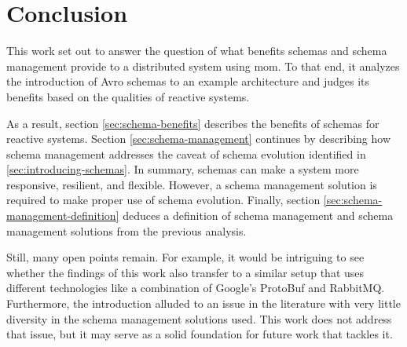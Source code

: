 
\section{Conclusion}\label{sec:conclusion}

This work set out to answer the question of what benefits schemas and schema management provide to a distributed system using \gls{mom}.
To that end, it analyzes the introduction of Avro schemas to an example architecture and judges its benefits based on the qualities of reactive systems.

As a result, section \ref{sec:schema-benefits} describes the benefits of schemas for reactive systems.
Section \ref{sec:schema-management} continues by describing how schema management addresses the caveat of schema evolution identified in \ref{sec:introducing-schemas}.
In summary, schemas can make a system more responsive, resilient, and flexible.
However, a schema management solution is required to make proper use of schema evolution.
Finally, section \ref{sec:schema-management-definition} deduces a definition of schema management and schema management solutions from the previous analysis.

Still, many open points remain.
For example, it would be intriguing to see whether the findings of this work also transfer to a similar setup that uses different technologies like a combination of Google's ProtoBuf and RabbitMQ.
Furthermore, the introduction alluded to an issue in the literature with very little diversity in the schema management solutions used.
This work does not address that issue, but it may serve as a solid foundation for future work that tackles it.
